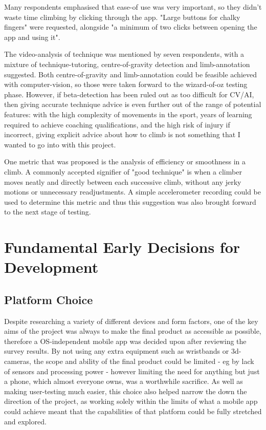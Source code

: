 Many respondents emphasised that ease-of use was very important, so they didn't waste time climbing by clicking through the app.
"Large buttons for chalky fingers" were requested, alongside "a minimum of two clicks between opening the app and using it".

The video-analysis of technique was mentioned by seven respondents, with a mixture of technique-tutoring, centre-of-gravity detection and limb-annotation suggested.
Both centre-of-gravity and limb-annotation could be feasible achieved with computer-vision, so those were taken forward to the wizard-of-oz testing phase.
However, if beta-detection has been ruled out as too difficult for CV/AI, then giving accurate technique advice is even further out of the range of potential features: with the high complexity of movements in the sport, years of learning required to achieve coaching qualifications, and the high risk of injury if incorrect, giving explicit advice about how to climb is not something that I wanted to go into with this project.

One metric that was proposed is the analysis of efficiency or smoothness in a climb.
A commonly accepted signifier of "good technique" is when a climber moves neatly and directly between each successive climb, without any jerky motions or unnecessary readjustments.
A simple accelerometer recording could be used to determine this metric and thus this suggestion was also brought forward to the next stage of testing.



\section{Fundamental Early Decisions for Development}

\subsection{Platform Choice}
Despite researching a variety of different devices and form factors, one of the key aims of the project was always to make the final product as accessible as possible, therefore a OS-independent mobile app was decided upon after reviewing the survey results.
By not using any extra equipment such as wristbands or 3d-cameras, the scope and ability of the final product could be limited - eg by lack of sensors and processing power - however limiting the need for anything but just a phone, which almost everyone owns, was a worthwhile sacrifice.
As well as making user-testing much easier, this choice also helped narrow the down the direction of the project, as working solely within the limits of what a mobile app could achieve meant that the capabilities of that platform could be fully stretched and explored.

